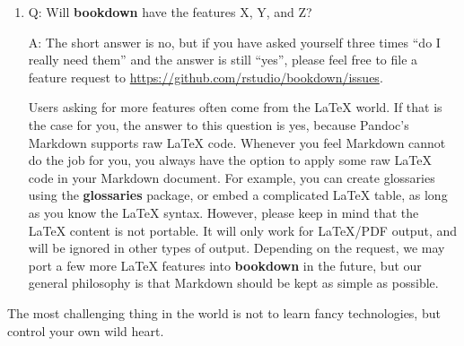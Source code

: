 \documentclass[
  12pt,
]{krantz}
\begin{document}
\begin{enumerate}
\def\labelenumi{\arabic{enumi}.}
\item
  Q: Will \textbf{bookdown} have the features X, Y, and Z?

  A: The short answer is no, but if you have asked yourself three times ``do I really need them'' and the answer is still ``yes'', please feel free to file a feature request to \url{https://github.com/rstudio/bookdown/issues}.

  Users asking for more features often come from the LaTeX world. If that is the case for you, the answer to this question is yes, because Pandoc's Markdown supports raw LaTeX code. Whenever you feel Markdown cannot do the job for you, you always have the option to apply some raw LaTeX code in your Markdown document. For example, you can create glossaries using the \textbf{glossaries} package, or embed a complicated LaTeX table, as long as you know the LaTeX syntax. However, please keep in mind that the LaTeX content is not portable. It will only work for LaTeX/PDF output, and will be ignored in other types of output. Depending on the request, we may port a few more LaTeX features into \textbf{bookdown} in the future, but our general philosophy is that Markdown should be kept as simple as possible.
\end{enumerate}

The most challenging thing in the world is not to learn fancy technologies, but control your own wild heart.

\backmatter

  

\printindex
\end{document}
